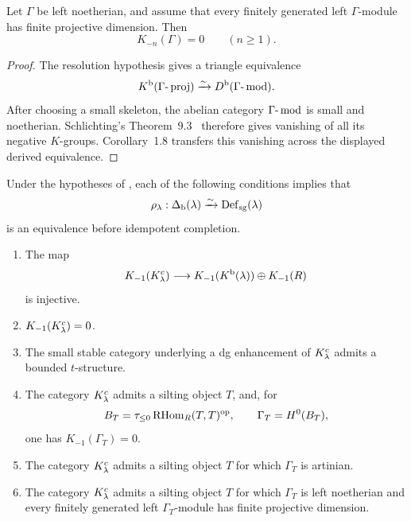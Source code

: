 \begin{lemma}\label{lem:regular-noetherian-negative-k}
Let \(\Gamma\) be left noetherian, and assume that every finitely generated left \(\Gamma\)-module has finite projective dimension.  Then
\[
 K_{-n}(\Gamma)=0
 \qquad(n\ge1).
\]
\end{lemma}

\begin{proof}
The resolution hypothesis gives a triangle equivalence
\[
 K^{\mathrm b}(\Gamma\text{-}\operatorname{proj})
 \xrightarrow{\sim}
 D^{\mathrm b}(\Gamma\text{-}\operatorname{mod}).
\]
After choosing a small skeleton, the abelian category \(\Gamma\text{-}\operatorname{mod}\) is small and noetherian.  Schlichting's Theorem~9.3~\cite{Schlichting06} therefore gives vanishing of all its negative \(K\)-groups.  Corollary~1.8 transfers this vanishing across the displayed derived equivalence.
\end{proof}

\begin{theorem}\label{thm:negative-k-vanishing}
Under the hypotheses of , each of the following conditions implies that
\[
 \rho_\lambda:\Delta_{\mathrm b}(\lambda)\xrightarrow{\sim}\operatorname{Def}_{\mathrm{sg}}(\lambda)
\]
is an equivalence before idempotent completion.
\begin{enumerate}[label=\textup{(\arabic*)}]
\item The map
\[
 K_{-1}(K^c_\lambda)
 \longrightarrow
 K_{-1}(K^{\mathrm b}(\lambda))\oplus K_{-1}(R)
\]
is injective.
\item \(K_{-1}(K^c_\lambda)=0\).
\item The small stable category underlying a dg enhancement of \(K^c_\lambda\) admits a bounded \(t\)-structure.
\item The category \(K^c_\lambda\) admits a silting object \(T\), and, for
\[
 B_T=\tau_{\le0}\operatorname{RHom}_R(T,T)^{\mathrm{op}},
 \qquad
 \Gamma_T=H^0(B_T),
\]
one has \(K_{-1}(\Gamma_T)=0\).
\item The category \(K^c_\lambda\) admits a silting object \(T\) for which \(\Gamma_T\) is artinian.
\item The category \(K^c_\lambda\) admits a silting object \(T\) for which \(\Gamma_T\) is left noetherian and every finitely generated left \(\Gamma_T\)-module has finite projective dimension.
\end{enumerate}
\end{theorem}

